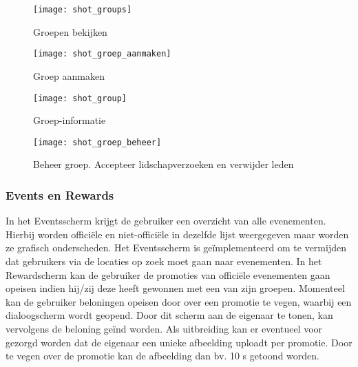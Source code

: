 \begin{figure}[ht]

\begin{minipage}[b]{0.25\linewidth}
\centering
\texttt{[image: shot\_groups]}
\caption{Groepen bekijken}
\label{fig:shot_groups}
\end{minipage}
\hspace{1cm}
\begin{minipage}[b]{0.25\linewidth}
\centering
\texttt{[image: shot\_groep\_aanmaken]}
\caption{Groep aanmaken}
\label{fig:shot_groep_aanmaken}
\end{minipage}
\hspace{1cm}
\begin{minipage}[b]{0.25\linewidth}
\centering
\texttt{[image: shot\_group]}
\caption{Groep-informatie}
\label{fig:shot_group}
\end{minipage}

\end{figure}

\begin{figure}[ht]
\centering
\begin{minipage}[b]{0.5\linewidth}
\centering
\texttt{[image: shot\_groep\_beheer]}
\caption{Beheer groep. Accepteer lidschapverzoeken en verwijder leden}
\label{fig:shot_groep_beheer}
\end{minipage}


\end{figure}

\clearpage

\subsubsection{Events en Rewards}%
In het Eventsscherm krijgt de gebruiker een overzicht van alle evenementen. Hierbij worden officiële en niet-officiële in dezelfde lijst weergegeven maar worden ze grafisch onderscheden. Het Eventsscherm is geïmplementeerd om te vermijden dat gebruikers via de locaties op zoek moet gaan naar evenementen.
In het Rewardscherm kan de gebruiker de promoties van officiële evenementen gaan opeisen indien hij/zij deze heeft gewonnen met een van zijn groepen. Momenteel kan de gebruiker beloningen opeisen door over een promotie te vegen, waarbij een dialoogscherm wordt geopend. Door dit scherm aan de eigenaar te tonen, kan vervolgens de beloning geïnd worden. Als uitbreiding kan er eventueel voor gezorgd worden dat de eigenaar een unieke afbeelding uploadt per promotie. Door te vegen over de promotie kan de afbeelding dan bv. 10 s getoond worden.
